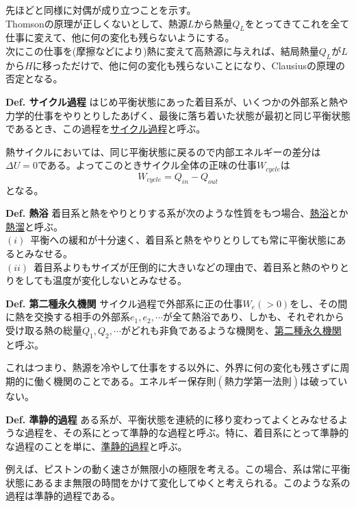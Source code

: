\documentclass{jsarticle}
\begin{document}
先ほどと同様に対偶が成り立つことを示す。\\
Thomsonの原理が正しくないとして、熱源\(L\)から熱量\(Q_{L}\)をとってきてこれを全て仕事に変えて、他に何の変化も残らないようにする。\\
次にこの仕事を(摩擦などにより)熱に変えて高熱源に与えれば、結局熱量\(Q_{L}\)が\(L\)から\(H\)に移っただけで、他に何の変化も残らないことになり、Clausiusの原理の否定となる。\\
\begin{itembox}[l]{\textbf{Def. サイクル過程}}
はじめ平衡状態にあった着目系が、いくつかの外部系と熱や力学的仕事をやりとりしたあげく、最後に落ち着いた状態が最初と同じ平衡状態であるとき、この過程を\underline{サイクル過程}と呼ぶ。
\end{itembox}
熱サイクルにおいては、同じ平衡状態に戻るので内部エネルギーの差分は\(\Delta U=0\)である。よってこのときサイクル全体の正味の仕事\(W_{cycle}\)は
\[W_{cycle}=Q_{in}-Q_{out}\]
となる。
\begin{itembox}[l]{\textbf{Def. 熱浴}}
着目系と熱をやりとりする系が次のような性質をもつ場合、\underline{熱浴}とか\underline{熱溜}と呼ぶ。\\
\((i)\)~平衡への緩和が十分速く、着目系と熱をやりとりしても常に平衡状態にあるとみなせる。\\
\((ii)\)~着目系よりもサイズが圧倒的に大きいなどの理由で、着目系と熱のやりとりをしても温度が変化しないとみなせる。
\end{itembox}
\begin{itembox}[l]{\textbf{Def. 第二種永久機関}}
サイクル過程で外部系に正の仕事\(W_{e}(>0)\)をし、その間に熱を交換する相手の外部系\(e_{1},e_{2},\cdots\)が全て熱浴であり、しかも、それぞれから受け取る熱の総量\(Q_{1},Q_{2},\cdots\)がどれも非負であるような機関を、\underline{第二種永久機関}と呼ぶ。
\end{itembox}
これはつまり、熱源を冷やして仕事をする以外に、外界に何の変化も残さずに周期的に働く機関のことである。エネルギー保存則\((熱力学第一法則)\)は破っていない。\\
\begin{itembox}[l]{\textbf{Def. 準静的過程}}
ある系が、平衡状態を連続的に移り変わってよくとみなせるような過程を、その系にとって準静的な過程と呼ぶ。特に、着目系にとって準静的な過程のことを単に、\underline{準静的過程}と呼ぶ。
\end{itembox}
例えば、ピストンの動く速さが無限小の極限を考える。この場合、系は常に平衡状態にあるまま無限の時間をかけて変化してゆくと考えられる。このような系の過程は準静的過程である。\\
\end{document}
